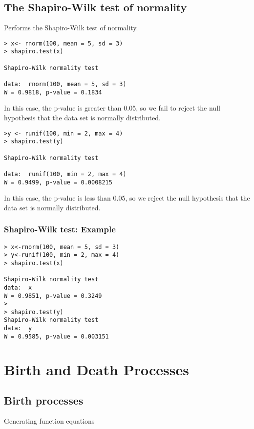 \section{The Shapiro-Wilk test of normality}
Performs the Shapiro-Wilk test of normality.
\begin{verbatim}
> x<- rnorm(100, mean = 5, sd = 3)
> shapiro.test(x)

Shapiro-Wilk normality test

data:  rnorm(100, mean = 5, sd = 3)
W = 0.9818, p-value = 0.1834
\end{verbatim}
In this case, the p-value is greater than 0.05, so we fail to reject the null hypothesis that the
data set is normally distributed.
\begin{verbatim}
>y <- runif(100, min = 2, max = 4)
> shapiro.test(y)

Shapiro-Wilk normality test

data:  runif(100, min = 2, max = 4)
W = 0.9499, p-value = 0.0008215
\end{verbatim}
In this case, the p-value is less than 0.05, so we reject the null hypothesis that the
data set is normally distributed.



\subsection{Shapiro-Wilk test: Example}

\begin{verbatim}
> x<-rnorm(100, mean = 5, sd = 3)
> y<-runif(100, min = 2, max = 4)
> shapiro.test(x)

Shapiro-Wilk normality test
data:  x
W = 0.9851, p-value = 0.3249
>
> shapiro.test(y)
Shapiro-Wilk normality test
data:  y
W = 0.9585, p-value = 0.003151

\end{verbatim}
\newpage
\chapter{Birth and Death Processes}


\section{Birth processes}
Generating function equations

